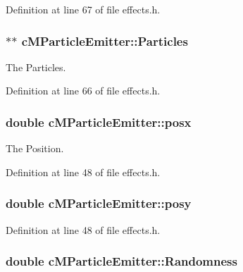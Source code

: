 Definition at line 67 of file effects.\-h.

\hypertarget{classc_m_particle_emitter_a3bf5a6c00f48acdfa11f5080fe07e665}{
\subsubsection[{Particles}]{$\ast$$\ast$ c\-M\-Particle\-Emitter\-::\-Particles}}\label{classc_m_particle_emitter_a3bf5a6c00f48acdfa11f5080fe07e665}


The Particles. 



Definition at line 66 of file effects.\-h.

\hypertarget{classc_m_particle_emitter_a5d72b6783d396a4dedc82c5fa251f39c}{
\subsubsection[{posx}]{\setlength{\rightskip}{0pt plus 5cm}double c\-M\-Particle\-Emitter\-::posx}}\label{classc_m_particle_emitter_a5d72b6783d396a4dedc82c5fa251f39c}


The Position. 



Definition at line 48 of file effects.\-h.

\hypertarget{classc_m_particle_emitter_aff5224c1f6f6cf5f1ac0cd46227c3eb2}{
\subsubsection[{posy}]{\setlength{\rightskip}{0pt plus 5cm}double c\-M\-Particle\-Emitter\-::posy}}\label{classc_m_particle_emitter_aff5224c1f6f6cf5f1ac0cd46227c3eb2}


Definition at line 48 of file effects.\-h.

\hypertarget{classc_m_particle_emitter_af574c02b147d312f4b0dea4c6a7ff4f5}{
\subsubsection[{Randomness}]{\setlength{\rightskip}{0pt plus 5cm}double c\-M\-Particle\-Emitter\-::\-Randomness}}\label{classc_m_particle_emitter_af574c02b147d312f4b0dea4c6a7ff4f5}


